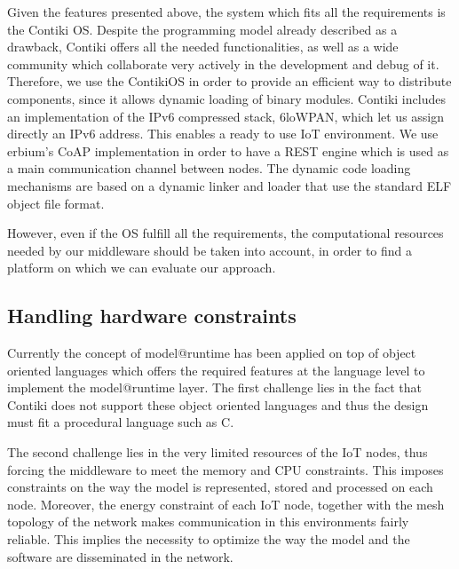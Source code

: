 Given the features presented above, the system which fits all the requirements is the Contiki OS.
Despite the programming model already described as a drawback, Contiki offers all the needed functionalities, as well as a wide community which collaborate very actively in the development and debug of it.
Therefore, we use the ContikiOS\cite{dunkels2004contiki} in order to provide an efficient way to distribute components, since it allows dynamic loading of binary modules.
Contiki includes an implementation of the IPv6 compressed stack, 6loWPAN\cite{rfc4944}, which let us assign directly an IPv6 address. 
This enables a ready to use IoT environment.
We use erbium's\cite{rfc7252} CoAP implementation in order to have a REST engine which is used as a main communication channel between nodes. The dynamic code loading mechanisms are based on a dynamic linker and loader that use the standard ELF object file format\cite{dunkels06runtime}.

However, even if the OS fulfill all the requirements, the computational resources needed by our middleware should be taken into account, in order to find a platform on which we can evaluate our approach.


\subsection{Handling hardware constraints}
Currently the concept of model@runtime has been applied on top of object oriented languages which offers the required features at the language level to implement the model@runtime layer. 
The first challenge lies in the fact that Contiki does not support these object oriented languages and thus the design must fit a procedural language such as C.

The second challenge lies in the very limited resources of the IoT nodes, thus forcing the middleware to meet the memory and CPU constraints. 
This imposes constraints on the way the model is represented, stored and processed on each node.
Moreover, the energy constraint of each IoT node, together with the mesh topology of the network makes communication in this environments fairly reliable.
This implies the necessity to optimize the way the model and the software are disseminated in the network.


